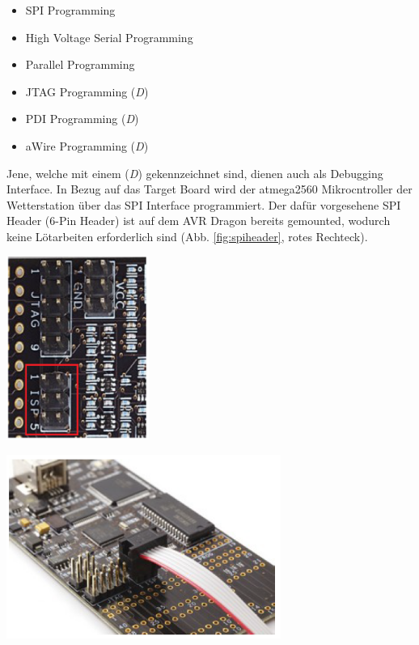 \begin{itemize}
	\item SPI Programming 
	\item High Voltage Serial Programming
	\item Parallel Programming
	\item JTAG Programming (\textit{D})
	\item PDI Programming (\textit{D})
	\item aWire Programming (\textit{D})
\end{itemize}
Jene, welche mit einem (\textit{D}) gekennzeichnet sind, dienen auch als Debugging Interface. In Bezug auf das Target Board wird der atmega2560 Mikrocntroller der Wetterstation über das SPI Interface programmiert. Der dafür vorgesehene SPI Header (6-Pin Header) ist auf dem AVR Dragon bereits gemounted, wodurch keine Lötarbeiten erforderlich sind (Abb. \ref{fig:spiheader}, rotes Rechteck).\\

\begin{center}
\begin{minipage}[b][7cm][t]{0.4\textwidth}
\centering
\includegraphics[height=6cm]{graphics/ISP/spi_header.PNG} 
\label{fig:spiheader}
\end{minipage}
\begin{minipage}[b][7cm][t]{0.58\textwidth}
\centering
\includegraphics[height=6cm]{graphics/ISP/spi_header_anschluss.PNG} 
\label{fig:spiheader_anschluss}
\end{minipage}
\end{center}

